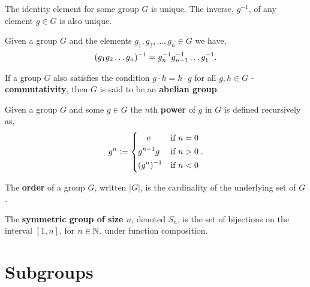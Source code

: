 \documentclass[../Year1/Year1.tex]{subfiles}
\begin{document}
\begin{theorem}[Uniqueness]
    The identity element for some group $G$ is unique. The inverse, $g^{-1}$, of any element $g\in G$ is also unique.
\end{theorem}

\begingroup\belowdisplayskip=-10pt
\begin{lemma}
    Given a group $G$ and the elements $g_1,g_2,\ldots,g_n\in G$ we have, \[
        (g_1g_2\dots g_n)^{-1} = g_n^{-1}g_{n-1}^{-1}\dots g_1^{-1}
        \textcolor{black}{.}
    \]
\end{lemma}
\endgroup

\begin{definition}
    If a group $G$ also satisfies the condition $g\cdot h = h\cdot g$ for all $g,h\in G$ - \textbf{commutativity}, then $G$ is said to be an \textbf{abelian group}.
\end{definition}

\begingroup\belowdisplayskip=-10pt
\begin{definition}
    Given a group $G$ and some $g\in G$ the $n$th \textbf{power} of $g$ in $G$ is defined recursively as, \[
        g^n:= \begin{dcases}
            \omit\hfil e  \hfil & \text{\textcolor{black}{if }} n=0 \\
            g^{n-1}g & \text{\textcolor{black}{if }} n>0 \\
            (g^{n})^{-1} & \text{\textcolor{black}{if }} n<0 \\
        \end{dcases}
    \textcolor{black}{.}
    \]
\end{definition}
\endgroup

\begin{definition}
    The \textbf{order} of a group $G$, written $|G|$, is the cardinality of the underlying set of $G$.
\end{definition}

\begin{example}
    The \textbf{symmetric group of size $n$}, denoted $S_n$, is the set of bijections on the interval $[1,n]$, for $n\in\mathbb{N}$, under function composition.
\end{example}

\section{Subgroups}
\end{document}
